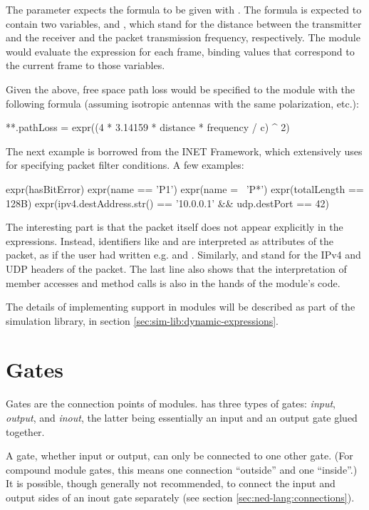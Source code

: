 The  parameter expects the formula to be given with
. The formula is expected to contain two variables,
 and , which stand for the distance between the
transmitter and the receiver and the packet transmission frequency,
respectively. The module would evaluate the expression for each frame, binding
values that correspond to the current frame to those variables.

Given the above, free space path loss would be specified to the module with the
following formula (assuming isotropic antennas with the same polarization,
etc.):

\begin{inifile}
**.pathLoss = expr((4 * 3.14159 * distance * frequency / c) ^ 2)
\end{inifile}

The next example is borrowed from the INET Framework, which extensively uses
 for specifying packet filter conditions. A few examples:

\begin{ned}
expr(hasBitError)
expr(name == 'P1')
expr(name =~ 'P*')
expr(totalLength == 128B)
expr(ipv4.destAddress.str() == '10.0.0.1' && udp.destPort == 42)
\end{ned}

The interesting part is that the packet itself does not appear explicitly in the
expressions. Instead, identifiers like  and  are
interpreted as attributes of the packet, as if the user had written e.g.
 and . Similarly,  and 
stand for the IPv4 and UDP headers of the packet. The last line also shows that
the interpretation of member accesses and method calls is also in the hands of
the module's code.

The details of implementing  support in modules will be
described as part of the simulation library, in section
\ref{sec:sim-lib:dynamic-expressions}.


\section{Gates}
\label{sec:ned-lang:gates}

Gates are the connection points of modules. {\opp} has three types of
gates: \textit{input}, \textit{output}, and \textit{inout}, the latter being
essentially an input and an output gate glued together.

A gate, whether input or output, can only be connected to one other
gate. (For compound module gates, this means one connection ``outside'' and
one ``inside''.) It is possible, though generally not recommended, to
connect the input and output sides of an inout gate separately (see section
\ref{sec:ned-lang:connections}).


